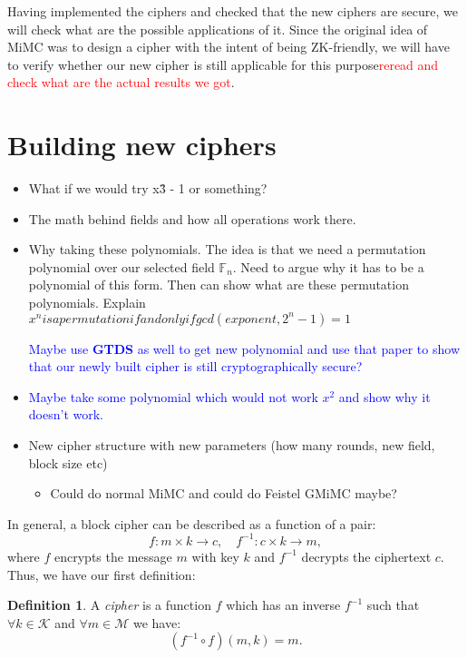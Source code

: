 \documentclass{Resources/UoBLab1}
\theoremstyle{definition}
\newtheorem{definition}[theorem]{Definition}
\begin{document}
Having implemented the ciphers and checked that the new ciphers are secure, we will check what are the possible applications of it. Since the original idea of MiMC was to design a cipher with the intent of being ZK-friendly, we will have to verify whether our new cipher is still applicable for this purpose\textcolor{red}{reread and check what are the actual results we got}.


\section{Building new ciphers}
\begin{itemize}
    \item What if we would try x\^ 3 - 1 or something?
    \item The math behind fields and how all operations work there.
    \item Why taking these polynomials. The idea is that we need a permutation polynomial over our selected field $\mathbb{F}_n$. Need to argue why it has to be a polynomial of this form. Then can show what are these permutation polynomials. Explain \(x^n is a permutation if and only if gcd(exponent, 2^n - 1) = 1\)\par
    \textcolor{blue}{Maybe use \textbf{GTDS} as well to get new polynomial and use that paper to show that our newly built cipher is still cryptographically secure?}
    \item \textcolor{blue}{Maybe take some polynomial which would not work $x^2$ and show why it doesn't work.}
    \item New cipher structure with new parameters (how many rounds, new field, block size etc)
    \begin{itemize}
        \item Could do normal MiMC and could do Feistel GMiMC maybe?
    \end{itemize}
\end{itemize}
\vspace{10pt}
In general, a block cipher can be described as a function of a pair:
\[
f : m \times k \to c,\quad f^{-1} : c \times k \to m,
\]
where $f$ encrypts the message $m$ with key $k$ and $f^{-1}$ decrypts the ciphertext $c$. Thus, we have our first definition:
\begin{definition}\label{def:1}
    A \textit{cipher} is a function $f$ which has an inverse $f^{-1}$ such that \(\forall k \in \mathcal{K}\) and \(\forall m \in \mathcal{M}\) we have:
    \[
        (f^{-1} \circ f)(m, k) = m.
    \]
\end{definition}
\end{document}
